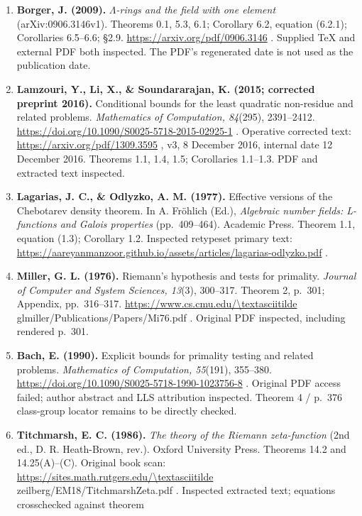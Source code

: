 \documentclass[11pt,a4paper]{article}
\theoremstyle{definition}\newtheorem{definition}[theorem]{Definition}
\theoremstyle{remark}\newtheorem{remark}[theorem]{Remark}
\begin{document}
\begin{enumerate}
\def\labelenumi{\arabic{enumi}.}
\item
  \textbf{Borger, J. (2009).} \emph{\(\Lambda\)-rings and the field with
  one element} (arXiv:0906.3146v1). Theorems 0.1, 5.3, 6.1; Corollary
  6.2, equation (6.2.1); Corollaries 6.5--6.6; §2.9.
  \url{https://arxiv.org/pdf/0906.3146} . Supplied TeX and external PDF both
  inspected. The PDF's regenerated date is not used as the publication
  date.
\item
  \textbf{Lamzouri, Y., Li, X., \& Soundararajan, K. (2015; corrected
  preprint 2016).} Conditional bounds for the least quadratic
  non-residue and related problems. \emph{Mathematics of Computation,
  84}(295), 2391--2412. \url{https://doi.org/10.1090/S0025-5718-2015-02925-1}
  . Operative corrected text: \url{https://arxiv.org/pdf/1309.3595} , v3, 8
  December 2016, internal date 12 December 2016. Theorems 1.1, 1.4, 1.5;
  Corollaries 1.1--1.3. PDF and extracted text inspected.
\item
  \textbf{Lagarias, J. C., \& Odlyzko, A. M. (1977).} Effective versions
  of the Chebotarev density theorem. In A. Fröhlich (Ed.),
  \emph{Algebraic number fields: L-functions and Galois properties}
  (pp.~409--464). Academic Press. Theorem 1.1, equation (1.3); Corollary
  1.2. Inspected retypeset primary text:
  \url{https://aareyanmanzoor.github.io/assets/articles/lagarias-odlyzko.pdf}
  .
\item
  \textbf{Miller, G. L. (1976).} Riemann's hypothesis and tests for
  primality. \emph{Journal of Computer and System Sciences, 13}(3),
  300--317. Theorem 2, p.~301; Appendix, pp.~316--317.
  \url{https://www.cs.cmu.edu/\textasciitilde} glmiller/Publications/Papers/Mi76.pdf
  . Original PDF inspected, including rendered p.~301.
\item
  \textbf{Bach, E. (1990).} Explicit bounds for primality testing and
  related problems. \emph{Mathematics of Computation, 55}(191),
  355--380. \url{https://doi.org/10.1090/S0025-5718-1990-1023756-8} . Original
  PDF access failed; author abstract and LLS attribution inspected.
  Theorem 4 / p.~376 class-group locator remains to be directly checked.
\item
  \textbf{Titchmarsh, E. C. (1986).} \emph{The theory of the Riemann
  zeta-function} (2nd ed., D. R. Heath-Brown, rev.). Oxford University
  Press. Theorems 14.2 and 14.25(A)--(C). Original book scan:
  \url{https://sites.math.rutgers.edu/\textasciitilde} zeilberg/EM18/TitchmarshZeta.pdf
  . Inspected extracted text; equations crosschecked against theorem

\end{enumerate}
\end{document}
